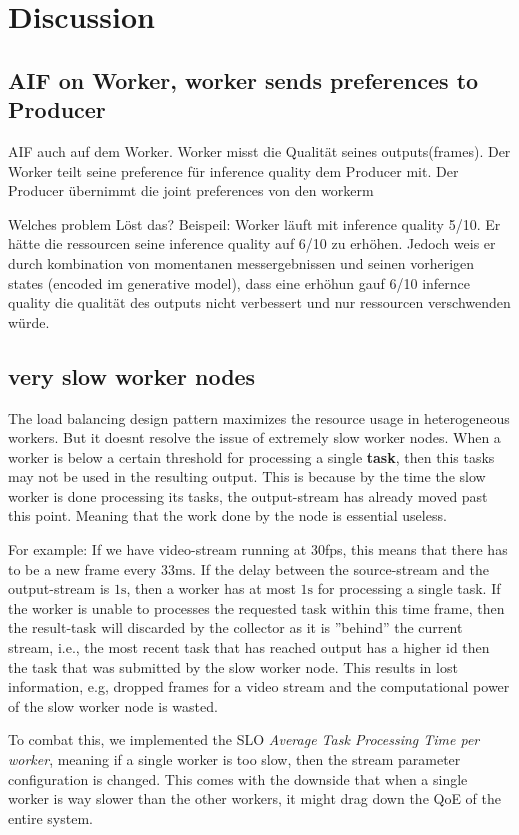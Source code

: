 \chapter{Discussion}
\section{AIF on Worker, worker sends preferences to Producer}
AIF auch auf dem Worker. Worker misst die Qualität seines outputs(frames). 
Der Worker teilt seine preference für inference quality dem Producer mit. 
Der Producer übernimmt die joint preferences von den workerm

Welches problem Löst das? Beispeil:
Worker läuft mit inference quality  5/10. Er hätte die ressourcen seine inference quality auf 6/10 zu erhöhen.
Jedoch weis er durch kombination von momentanen messergebnissen und seinen vorherigen states (encoded im generative model), dass eine erhöhun gauf 6/10 infernce quality die qualität des outputs nicht verbessert und nur ressourcen verschwenden würde.

\section{very slow worker nodes}
The load balancing design pattern maximizes the resource usage in heterogeneous workers. But it doesnt resolve the issue of extremely slow worker nodes. When a worker is below a certain threshold for processing a single \textbf{task}, then this tasks may not be used in the resulting output. This is because by the time the slow worker is done processing its tasks, the output-stream has already moved past this point. Meaning that the work done by the node is essential useless.

For example:
If we have video-stream running at 30fps, this means that there has to be a new frame every \(33\text{ms}\). If the delay between the source-stream and the output-stream is \(1\text{s}\), then a worker has at most \(1\text{s}\) for processing a single task. If the worker is unable to processes the requested task within this time frame, then the result-task will discarded by the collector as it is ''behind'' the current stream, i.e., the most recent task that has reached output has a higher id then the task that was submitted by the slow worker node. This results in lost information, e.g, dropped frames for a video stream and the computational power of the slow worker node is wasted.

To combat this, we implemented the SLO \textit{Average Task Processing Time per worker}, meaning if a single worker is too slow, then the stream parameter configuration is changed. This comes with the downside that when a single worker is way slower than the other workers, it might drag down the QoE of the entire system.